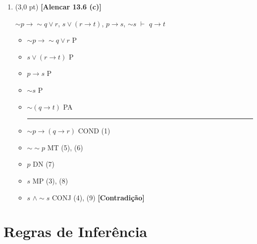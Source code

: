 \documentclass[12pt,a4paper,oneside]{article}
\begin{document}
\begin{enumerate}
\begin{enumerate}
		\newpage
		
		\item (3,0 pt) {\bf [Alencar 13.6 (c)]} 
		\begin{center}
			$\sim p \rightarrow \sim q \vee r$, $s \vee (r \rightarrow t)$, $p \rightarrow s$, $\sim s$ $\vdash$ $q \rightarrow t$
		\end{center}
		{\color{blue}
			\begin{itemize}
				\item[(1)] $\sim p \rightarrow \sim q \vee r$ \hspace*{0.8cm} P
				\item[(2)] $s \vee (r \rightarrow t)$ \hspace*{1.3cm} P
				\item[(3)] $p \rightarrow s$ \hspace*{2.2cm} P
				\item[(4)] $\sim s$ \hspace*{2.6cm} P
				\item[(5)] $\sim (q \rightarrow t)$ \hspace*{1.5cm} PA\\
				\rule{3cm}{0.5pt}
				\item[(6)] $\sim p \rightarrow (q \rightarrow r)$ \hspace*{0.3cm} COND (1)
				\item[(7)] $\sim \sim p$ \hspace*{1.9cm} MT (5), (6)
				\item[(8)] $p$ \hspace*{2.1cm} DN (7)
				\item[(9)] $s$ \hspace*{2.1cm} MP (3), (8)
				\item[(10)] $s$ $\wedge \sim s$ \hspace*{1.0cm} CONJ (4), (9) {\bf [Contradição]}
			\end{itemize}
		}
		\vspace*{0.3cm}
		
	\end{enumerate}

\end{enumerate}

\newpage

\section*{Regras de Inferência}
\end{document}
